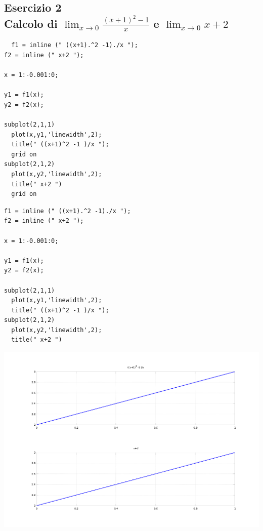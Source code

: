 \documentclass{article}
\begin{document}
\newpage
\subsection{ Esercizio 2 \\ Calcolo di $\lim_{x\to 0}{\frac{(x+1)^2-1}{x}}$ e $\lim_{x\to 0}{x+2}$}
\begin{lstlisting}
  f1 = inline (" ((x+1).^2 -1)./x ");
f2 = inline (" x+2 ");

x = 1:-0.001:0;

y1 = f1(x);
y2 = f2(x);

subplot(2,1,1) 
  plot(x,y1,'linewidth',2);
  title(" ((x+1)^2 -1 )/x ");
  grid on
subplot(2,1,2)
  plot(x,y2,'linewidth',2);
  title(" x+2 ")
  grid on
\end{lstlisting}


\begin{lstlisting}
f1 = inline (" ((x+1).^2 -1)./x ");
f2 = inline (" x+2 ");

x = 1:-0.001:0;

y1 = f1(x);
y2 = f2(x);

subplot(2,1,1) 
  plot(x,y1,'linewidth',2);
  title(" ((x+1)^2 -1 )/x ");
subplot(2,1,2)
  plot(x,y2,'linewidth',2);
  title(" x+2 ")
\end{lstlisting}


\centerline{\includegraphics[scale=0.6]{ex32.png}}


\newpage
\end{document}
